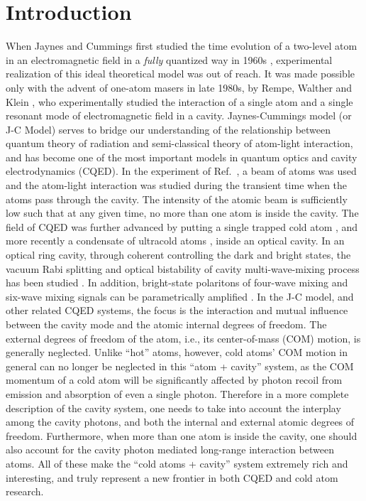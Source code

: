 \documentclass[atoms,article,submit,moreauthors,dvi2pdf,12pt,a4paper]{mdpi}
\begin{document}

\section{Introduction}

When Jaynes and Cummings first studied the time evolution of a two-level atom in an electromagnetic field in a {\em fully} quantized way in 1960s \cite{JCM}, experimental realization of this ideal theoretical model was out of reach. It was made possible only with the advent of one-atom masers in late 1980s, by Rempe, Walther and Klein \cite{exp1987}, who experimentally studied the interaction of a single atom and a single resonant mode of electromagnetic field in a cavity. Jaynes-Cummings model (or J-C Model) serves to bridge our understanding of the relationship between quantum theory of radiation and semi-classical theory of atom-light interaction, and has become one of the most important models in quantum optics and cavity electrodynamics (CQED).
In the experiment of Ref.~\cite{exp1987}, a beam of atoms was used and the atom-light interaction was studied during the transient time when the atoms pass through the cavity. The intensity of the atomic beam is sufficiently low such that at any given time, no more than one atom is inside the cavity.
The field of CQED was further advanced by putting a single trapped cold atom \cite{cavity0}, and more recently a condensate of ultracold atoms \cite{cavity1, cavity2, cavity3,Esslinger2010}, inside an optical cavity. In an optical ring cavity, through coherent controlling the dark and bright states, the vacuum Rabi splitting and optical bistability of cavity multi-wave-mixing process has been studied \cite{mixing1}. In addition, bright-state polaritons of four-wave mixing and six-wave mixing signals can be parametrically amplified \cite{mixing2}. In the J-C model, and other related CQED systems, the focus is the interaction and mutual influence between the cavity mode and the atomic internal degrees of freedom. The external degrees of freedom of the atom, i.e., its center-of-mass (COM) motion, is generally neglected. Unlike ``hot'' atoms, however, cold atoms' COM motion in general can no longer be neglected in this ``atom + cavity'' system, as the COM momentum of a cold atom will be significantly affected by photon recoil from emission and absorption of even a single photon. Therefore in a more complete description of the cavity system, one needs to take into account the interplay among the cavity photons, and both the internal and external atomic degrees of freedom. Furthermore, when more than one atom is inside the cavity, one should also account for the cavity photon mediated long-range interaction between atoms. All of these make the ``cold atoms + cavity'' system extremely rich and interesting, and truly represent a new frontier in both CQED and cold atom research.
\end{document}
